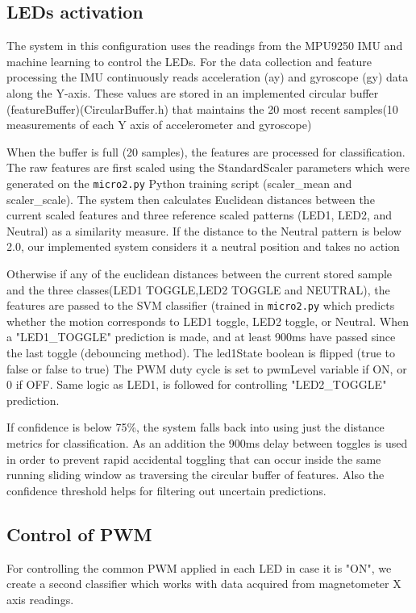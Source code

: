 \documentclass[a4paper,12pt]{article}
\begin{document}
\subsection{LEDs activation}
The system in this configuration uses the readings from the MPU9250 IMU 
and machine learning to control the LEDs. For the data collection and feature processing the IMU
continuously reads acceleration (ay) and gyroscope (gy) 
data along the Y-axis. These values are stored in an implemented circular buffer (featureBuffer)(CircularBuffer.h)
that maintains the 20 most recent samples(10 measurements of each Y axis of accelerometer and gyroscope)

When the buffer is full (20 samples), the features 
are processed for classification.
The raw features are first scaled using the StandardScaler parameters which were generated on the \texttt{micro2.py} Python training script
(scaler\_mean and scaler\_scale). The system then calculates Euclidean distances 
between the current scaled features and three reference scaled patterns (LED1, LED2, and Neutral) as a similarity measure.
If the distance to the Neutral pattern is below 2.0, our implemented system 
considers it a neutral position and takes no action

Otherwise if any of the euclidean distances between the current stored sample and the three classes(LED1 TOGGLE,LED2 TOGGLE and NEUTRAL), 
the features are passed to the SVM classifier (trained in \texttt{micro2.py} 
which predicts whether the motion corresponds to LED1 toggle, LED2 toggle, or Neutral.
When a "LED1\_TOGGLE" prediction is made, 
and at least 900ms have passed since the last toggle (debouncing method).
The led1State boolean is flipped (true to false or false to true)
The PWM duty cycle is set to pwmLevel variable if ON, or 0 if OFF.
Same logic as LED1, is followed for controlling "LED2\_TOGGLE" prediction.

If confidence is below 75\%, the system falls back 
into using just the distance metrics for classification.
As an addition the 900ms delay between toggles is used in order to prevent 
rapid accidental toggling that can occur inside the same running sliding window as
traversing the circular buffer of features.
Also the confidence threshold helps for filtering out uncertain predictions.

\subsection{Control of PWM}

For controlling the common PWM applied in each LED in case it is "ON",
we create a second classifier which works with data acquired from 
magnetometer X axis readings. 
\end{document}
